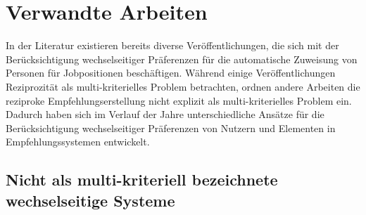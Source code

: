 
\chapter{Verwandte Arbeiten}
\label{ch:verwandte_arbeiten}
In der Literatur existieren bereits diverse Veröffentlichungen, die sich mit der Berücksichtigung wechselseitiger Präferenzen für die automatische Zuweisung von Personen für Jobpositionen beschäftigen.
Während einige Veröffentlichungen Reziprozität als multi-kriterielles Problem betrachten, ordnen andere Arbeiten die reziproke Empfehlungserstellung nicht explizit als multi-kriterielles Problem ein.
Dadurch haben sich im Verlauf der Jahre unterschiedliche Ansätze für die Berücksichtigung wechselseitiger Präferenzen von Nutzern und Elementen in Empfehlungssystemen entwickelt.

\section{Nicht als multi-kriteriell bezeichnete wechselseitige Systeme}

